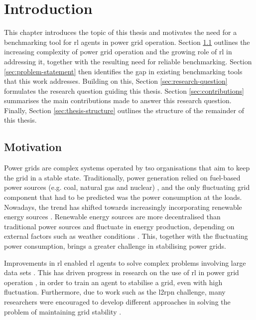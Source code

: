 \chapter{Introduction}\label{ch:introduction}
This chapter introduces the topic of this thesis and motivates the need for a benchmarking tool for \ac{rl} agents in power grid operation. Section \ref{sec:motivation} outlines the increasing complexity of power grid operation and the growing role of \ac{rl} in addressing it, together with the resulting need for reliable benchmarking. Section \ref{sec:problem-statement} then identifies the gap in existing benchmarking tools that this work addresses. Building on this, Section \ref{sec:research-question} formulates the research question guiding this thesis. Section \ref{sec:contributions} summarises the main contributions made to answer this research question. Finally, Section \ref{sec:thesis-structure} outlines the structure of the remainder of this thesis. 

\section{Motivation}\label{sec:motivation}
Power grids are complex systems operated by \ac{tso} organisations that aim to keep the grid in a stable state. Traditionally, power generation relied on fuel-based power sources (e.g. coal, natural gas and nuclear) \cite{rl4network_operation}, and the only fluctuating grid component that had to be predicted was the power consumption at the loads. Nowadays, the trend has shifted towards increasingly incorporating renewable energy sources \cite{us_epa_power_2022}. Renewable energy sources are more decentralised than traditional power sources \cite{RoleOfGridExtensionsEurope} and fluctuate in energy production, depending on external factors such as weather conditions \cite{challenges_integrating_var_renewables}. This, together with the fluctuating power consumption, brings a greater challenge in stabilising power grids. 

Improvements in \ac{rl} enabled \ac{rl} agents to solve complex problems involving large data sets \cite{glavic2017reinforcement}. This has driven progress in research on the use of \ac{rl} in power grid operation \cite{fan2022powergym}, in order to train an agent to stabilise a grid, even with high fluctuation. Furthermore, due to work such as the \ac{l2rpn} challenge, many researchers were encouraged to develop different approaches in solving the problem of maintaining grid stability \cite{l2rpn}. 

